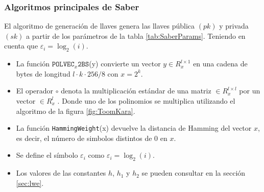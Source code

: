 \subsubsection{Algoritmos principales de Saber \cite{saber-spec-2020} }
 El algoritmo de generación de llaves genera las llaves pública \((pk)\) y privada \((sk)\) a partir de los parámetros de la tabla \ref{tab:SaberParams}. Teniendo en cuenta que \(\varepsilon_i=\log_2 (i)\).
 \begin{itemize}
 	\item La función $\texttt{POLVEC}_x\texttt{2BS}$(y) convierte un vector \(y\in R_x^{l\times 1}\) en una cadena de bytes de longitud \(l\cdot k \cdot 256/8\) con \(x=2^k\).
 	\item El operador \(\circ\) denota la multiplicación estándar de una matriz \(\in R_x^{l\times l}\) por un vector \(\in R_x^{l}\) . Donde uno de los polinomios se multiplica utilizando el algoritmo de la figura \ref{fig:ToomKara}.
 	\item La función \texttt{HammingWeight}(x) devuelve la distancia de Hamming del vector \(x\), es decir, el número de simbolos distintos de \(0\) en \(x\).
 	\item Se define el símbolo $\varepsilon_i$ como \(\varepsilon_i=\log_2 (i)\).
 	\item Los valores de las constantes \(h\), \(h_1\) y \(h_2\) se pueden consultar en la sección \ref{sec:lwe}.
 \end{itemize}
 \newpage
